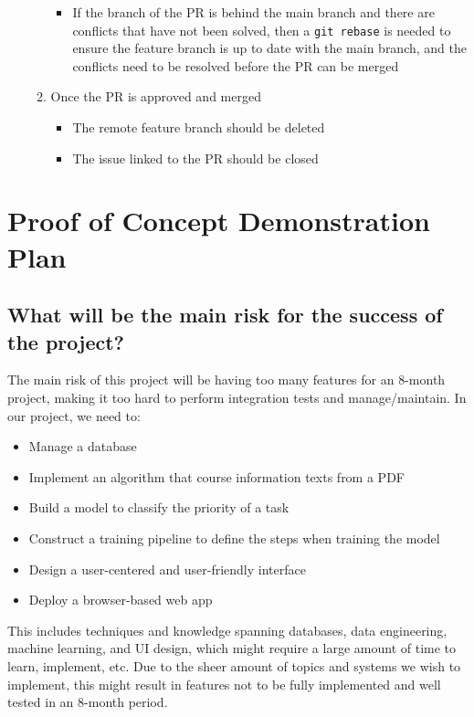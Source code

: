 \documentclass{article}
\begin{document}
\begin{itemize}
\begin{enumerate}
\begin{itemize}
                \item If the branch of the PR is behind the main branch and there are conflicts that have not been solved, then a \texttt{git rebase} is needed to ensure the feature branch is up to date with the main branch, and the conflicts need to be resolved before the PR can be merged
              \end{itemize}
            \item Once the PR is approved and merged
                \begin{itemize}
                    \item The remote feature branch should be deleted
                    \item The issue linked to the PR should be closed 
                \end{itemize}
        \end{enumerate}
\end{itemize}

\section{Proof of Concept Demonstration Plan}

\subsection*{What will be the main risk for the success of the project?} 
    The main risk of this project will be having too many features for an 8-month project, making it too hard to perform integration tests and manage/maintain. 
    In our project, we need to:
    \begin{itemize}
        \item Manage a database
        \item Implement an algorithm that course information texts from a PDF
        \item Build a model to classify the priority of a task
        \item Construct a training pipeline to define the steps when training the model
        \item Design a user-centered and user-friendly interface
        \item Deploy a browser-based web app
    \end{itemize}
    This includes techniques and knowledge spanning databases, data engineering, machine learning, and UI design, which might require a large amount of time to learn, implement, etc. Due to the sheer amount of topics and systems we wish to implement, this might result in features not to be fully implemented and well tested in an 8-month period.
\end{document}
